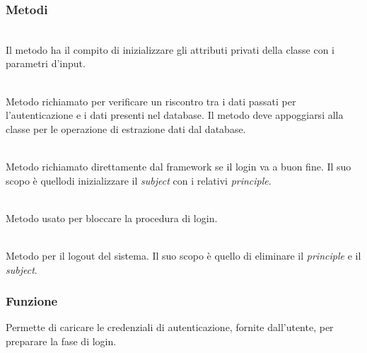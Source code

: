 \subsubsection*{Metodi}
\begin{description}
	\item{}\\
	Il metodo ha il compito di inizializzare gli attributi privati della classe con i parametri d'input.

	\item{}\\
	Metodo richiamato per verificare un riscontro tra i dati passati per l'autenticazione e i dati presenti nel database. Il metodo deve appoggiarsi alla classe  per le operazione di estrazione dati dal database.
	
	\item{}\\
	Metodo richiamato direttamente dal framework se il login va a buon fine. Il suo scopo è quellodi inizializzare il \textit{subject} con i relativi \textit{principle}.
	
	\item{}\\
	Metodo usato per bloccare la procedura di login.
	
	\item{}\\
	Metodo per il logout del sistema. Il suo scopo è quello di eliminare il \textit{principle} e il \textit{subject}.

\end{description}


\subsubsection*{Funzione}
Permette di caricare le credenziali di autenticazione, fornite dall'utente, per preparare la fase di login.


